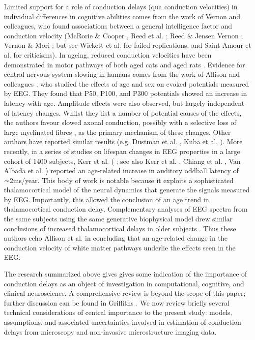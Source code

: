 Limited support for a role of conduction delays (qua conduction velocities) in individual differences in cognitive abilities comes from the work of Vernon and colleagues, who found associations between a general intelligence factor and conduction velocity (McRorie \& Cooper  \cite{mcrorie2004synaptic}, Reed et al. ; Reed \& Jensen \cite{reed1991arm,reed1992conduction,reed1993a}
Vernon \cite{vernon1983speed}; Vernon \& Mori  ; but see Wickett et al. \cite{wickett1994peripheral} for failed replications, and Saint-Amour et al.  for criticisms). In ageing, reduced conduction velocities have been demonstrated in motor pathways of both aged cats  and aged rats . Evidence for central nervous system slowing in humans comes from the work of Allison and colleagues , who studied the effects of age and sex on evoked potentials measured by EEG. They found that P50, P100, and P300 potentials showed an increase in latency with age.  Amplitude effects were also observed, but largely independent of latency changes. Whilst they list a number of potential causes of the effects, the authors favour slowed axonal conduction, possibly with a selective loss of large myelinated fibres , as the primary mechanism of these changes. Other authors have reported similar results (e.g. Dustman et al. , Kuba et al. ). More recently, in a series of studies on lifespan changes in EEG properties in a large cohort of 1400 subjects, Kerr et al. ( 
; see also Kerr et al. , Chiang et al. , Van Albada et al. ) reported an age-related increase in auditory oddball latency of ∼2ms/year. This body of work is notable because it exploits a sophisticated thalamocortical model of the neural dynamics that generate the signals measured by EEG. Importantly, this allowed the conclusion of an age trend in thalamocortical conduction delay. Complementary analyses of EEG spectra from the same subjects using the same generative biophysical model drew similar conclusions of increased thalamocortical delays in older subjects . Thus these authors echo Allison et al.  \citeyear{allison1984developmental} in concluding that an age-related change in the conduction velocity of white matter pathways underlie the effects seen in the EEG. 

The research summarized above gives gives some indication of the importance of conduction delays as an object of investigation in computational, cognitive, and clinical neuroscience. A comprehensive review is beyond the scope of this paper; further discussion can be found in Griffiths \citeyear{griffiths2014the}. We now review briefly several technical considerations of central importance to the present study: models, assumptions, and associated uncertainties involved in estimation of conduction delays from microscopy and non-invasive microstructure imaging data. 

